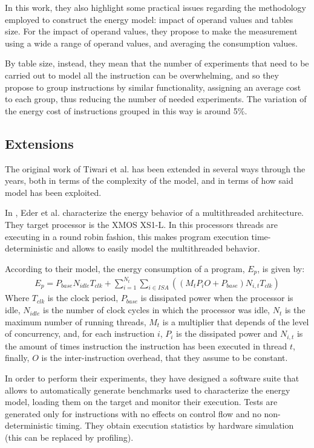 In this work, they also highlight some practical issues regarding the methodology employed to construct the energy model: impact of operand values and tables size. For the impact of operand values, they propose to make the measurement using a wide a range of operand values, and averaging the consumption values. \par 
By table size, instead, they mean that the number of experiments that need to be carried out to model all the instruction can be overwhelming, and so they propose to group instructions by similar functionality, assigning an average cost to each group, thus reducing the number of needed experiments. The variation of the energy cost of instructions grouped in this way is around 5\%. 

\subsection{Extensions}
The original work of Tiwari et al. has been extended in several ways through the years, both in terms of the complexity of the model, and in terms of how said model has been exploited. \par
In \cite{xmos}, Eder et al. characterize the energy behavior of a multithreaded architecture. They target processor is the XMOS XS1-L. In this processors threads are executing in a round robin fashion, this makes program execution time-deterministic and allows to easily model the multithreaded behavior. \par 
According to their model, the energy consumption of a program, $E_{p}$, is given by:
\begin{gather*} 
E_{p} = P_{base}N_{idle}T_{clk} + \sum_{i=1}^{N_{t}} \sum_{i \in ISA}((M_{t}P_{i}O + P_{base})N_{i,t}T_{clk})
\end{gather*}
Where $T_{clk}$ is the clock period, $P_{base}$ is dissipated power when the processor is idle, $N_{idle}$ is the number of clock cycles in which the processor was idle, $N_{t}$ is the maximum number of running threads, $M_{t}$ is a multiplier that depends of the level of concurrency, and, for each instruction $i$, $P_{i}$ is the dissipated power and $N_{i,t}$ is the amount of times instruction the instruction has been executed in thread $t$, finally, $O$ is the inter-instruction overhead, that they assume to be constant. \par 
In order to perform their experiments, they have designed a software suite that allows to automatically generate benchmarks used to characterize the energy model, loading them on the target and monitor their execution. Tests are generated only for instructions with no effects on control flow and no non-deterministic timing. They obtain execution statistics by hardware simulation (this can be replaced by profiling).
